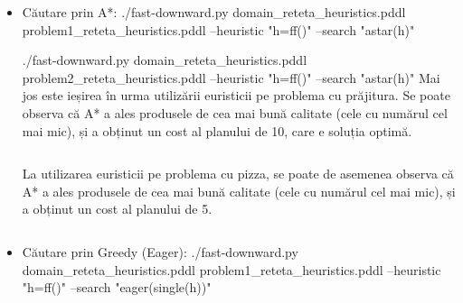  \begin{itemize}
    \setlength\itemsep{0em}
    \item Căutare prin A*:
    \newline
      \newline
    ./fast-downward.py domain\_reteta\_heuristics.pddl problem1\_reteta\_heuristics.pddl --heuristic "h=ff()" --search "astar(h)"
    
  
  \newline
    ./fast-downward.py domain\_reteta\_heuristics.pddl problem2\_reteta\_heuristics.pddl --heuristic "h=ff()" --search "astar(h)"
      \newline
      \newline
      Mai jos este ieșirea în urma utilizării euristicii pe problema cu prăjitura. Se poate observa că A* a ales produsele de cea mai bună calitate (cele cu numărul cel mai mic), și a obținut un cost al planului de 10, care e soluția optimă. 
      \newline
        \inputminted[linenos]{C}{cod/rez_problem_heuristic_astar.txt}
       \newline
      \newline
      La utilizarea euristicii pe problema cu pizza, se poate de asemenea observa că A* a ales produsele de cea mai bună calitate (cele cu numărul cel mai mic), și a obținut un cost al planului de 5. 
      \newline
        \inputminted[linenos]{C}{cod/rez_problem2_heuristic_astar.txt}   
        \newline
        \newline
    \item Căutare prin Greedy (Eager):
     \newline
      \newline
      ./fast-downward.py domain\_reteta\_heuristics.pddl problem1\_reteta\_heuristics.pddl --heuristic "h=ff()" --search "eager(single(h))"
       

\end{itemize}
